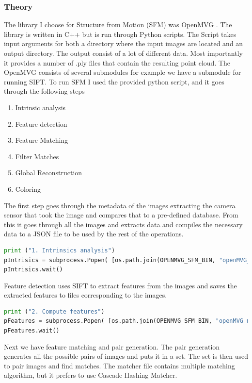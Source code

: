 \documentclass{article}
\begin{document}
    \subsubsection{Theory}
    The library I choose for Structure from Motion (SFM) was OpenMVG \cite{moulon2016openmvg}. The library is written in C++ but is run through Python scripts. The Script takes input arguments for both a directory where the input images are located and an output directory. The output consist of a lot of different data. Most importantly it provides a number of .ply files that contain the resulting point cloud. The OpenMVG consists of several submodules for example we have a submodule for running SIFT. To run SFM I used the provided python script, and it goes through the following steps
    \begin{enumerate}
        \item Intrinsic analysis
        \item Feature detection
        \item Feature Matching
        \item Filter Matches
        \item Global Reconstruction
        \item Coloring
    \end{enumerate}

    The first step goes through the metadata of the images extracting the camera sensor that took the image and compares that to a pre-defined database. From this it goes through all the images and extracts data and compiles the necessary data to a JSON file to be used by the rest of the operations.

    \begin{lstlisting}[language=python]
print ("1. Intrinsics analysis")
pIntrisics = subprocess.Popen( [os.path.join(OPENMVG_SFM_BIN, "openMVG_main_SfMInit_ImageListing"),  "-i", input_dir, "-o", matches_dir, "-d", camera_file_params] )
pIntrisics.wait()
    \end{lstlisting}
    Feature detection uses SIFT to extract features from the images and saves the extracted features to files corresponding to the images. 
    \begin{lstlisting}[language=python]
print ("2. Compute features")
pFeatures = subprocess.Popen( [os.path.join(OPENMVG_SFM_BIN, "openMVG_main_ComputeFeatures"),  "-i", matches_dir+"/sfm_data.json", "-o", matches_dir, "-m", "SIFT"] )
pFeatures.wait()
    \end{lstlisting}
    Next we have feature matching and pair generation. The pair generation generates all the possible pairs of images and puts it in a set. The set is then used to pair images and find matches. The matcher file contains multiple matching algorithm, but it prefers to use Cascade Hashing Matcher.
\end{document}
